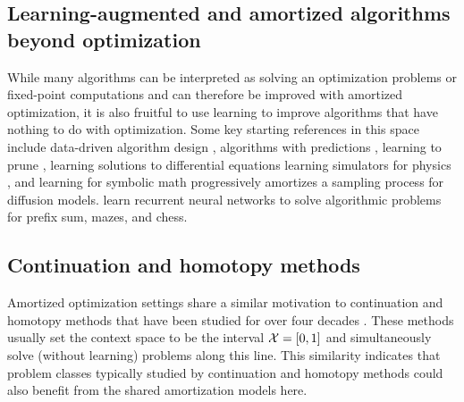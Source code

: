 \subsection{Learning-augmented and amortized algorithms beyond optimization}
While many algorithms can be interpreted as solving an
optimization problems or fixed-point computations and
can therefore be improved with amortized optimization,
it is also fruitful to use learning to improve
algorithms that have nothing to do with optimization.
Some key starting references in this space include
data-driven algorithm design \citep{balcan2020data},
algorithms with predictions
\citep{dinitz2021faster,sakaue2022discrete,chen2022faster,khodak2022learning},
learning to prune \citep{alabi2019learning},
learning solutions to differential equations
\citep{li2020fourier,poli2020hypersolvers,karniadakis2021physics,kovachki2021universal,chen2021solving,blechschmidt2021three,marwah2021parametric,berto2021neural}
learning simulators for physics \citep{grzeszczuk1998neuroanimator,ladicky2015data,he2019learning,sanchez2020learning,wiewel2019latent,usman2021machine,vinuesa2021potential},
and learning for symbolic math
\citep{lample2019deep,charton2021linear,charton2021deep,drori2021neural,dascoli2022deep}
\citet{salimans2022progressive} progressively amortizes a
sampling process for diffusion models.
\citet{schwarzschild2021can} learn recurrent neural networks
to solve algorithmic problems for prefix sum, mazes, and chess.

\subsection{Continuation and homotopy methods}
Amortized optimization settings share a similar motivation to
continuation and homotopy methods that have been studied for
over four decades
\citep{richter1983continuation,watson1989modern,allgower2012numerical}.
These methods usually set the context space to be the
interval ${\mathcal{X}}=[0,1]$ and simultaneously solve (without learning)
problems along this line.
This similarity indicates that problem classes typically
studied by continuation and homotopy methods could also benefit
from the shared amortization models here.

